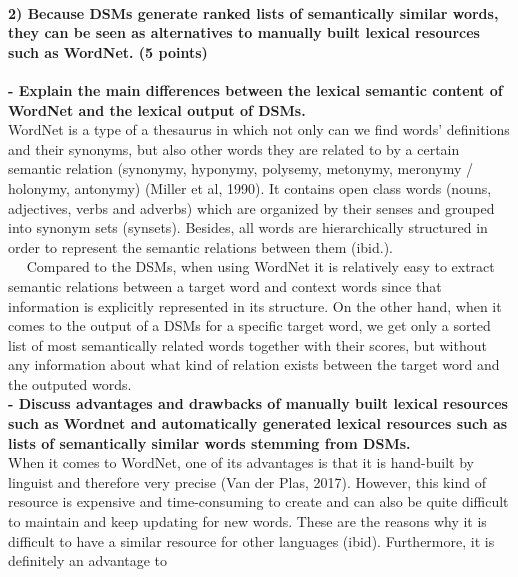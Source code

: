 \documentclass[11pt]{article}
\begin{document}
    \hypertarget{because-dsms-generate-ranked-lists-of-semantically-similar-words-they-can-be-seen-as-alternatives-to-manually-built-lexical-resources-such-as-wordnet.-5-points}{%
\paragraph{2) Because DSMs generate ranked lists of semantically similar
words, they can be seen as alternatives to manually built lexical
resources such as WordNet. (5
points)}\label{because-dsms-generate-ranked-lists-of-semantically-similar-words-they-can-be-seen-as-alternatives-to-manually-built-lexical-resources-such-as-wordnet.-5-points}}

\textbf{- Explain the main differences between the lexical semantic
content of WordNet and the lexical output of DSMs. }\\
WordNet is a type of a thesaurus in which not only can we find words'
definitions and their synonyms, but also other words they are related to
by a certain semantic relation (synonymy, hyponymy, polysemy, metonymy,
meronymy / holonymy, antonymy) (Miller et al, 1990). It contains open
class words (nouns, adjectives, verbs and adverbs) which are organized
by their senses and grouped into synonym sets (synsets). Besides, all
words are hierarchically structured in order to represent the semantic
relations between them (ibid.).\\
   Compared to the DSMs, when using WordNet it is relatively easy to
extract semantic relations between a target word and context words since
that information is explicitly represented in its structure. On the
other hand, when it comes to the output of a DSMs for a specific target
word, we get only a sorted list of most semantically related words
together with their scores, but without any information about what kind
of relation exists between the target word and the outputed words.\\
 \textbf{- Discuss advantages and drawbacks of manually built lexical
resources such as Wordnet and automatically generated lexical resources
such as lists of semantically similar words stemming from DSMs. }\\
When it comes to WordNet, one of its advantages is that it is hand-built
by linguist and therefore very precise (Van der Plas, 2017). However,
this kind of resource is expensive and time-consuming to create and can
also be quite difficult to maintain and keep updating for new words.
These are the reasons why it is difficult to have a similar resource for
other languages (ibid). Furthermore, it is definitely an advantage to
\end{document}
